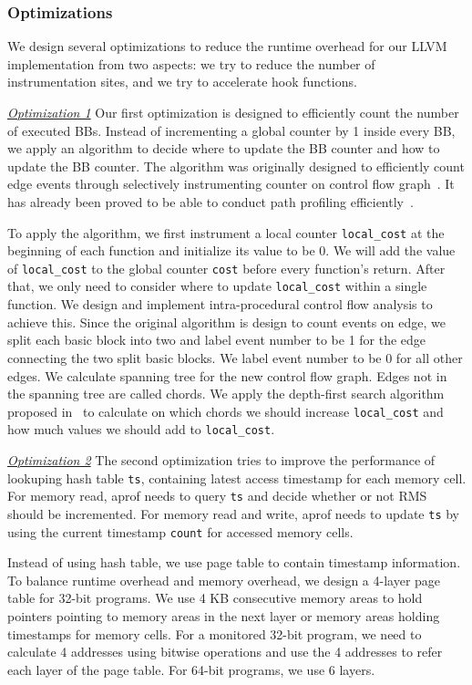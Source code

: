\subsubsection{Optimizations}
We design several optimizations to reduce the 
runtime overhead for our LLVM implementation from two aspects:
we try to reduce the number of instrumentation sites, 
and we try to accelerate hook functions. 

{\underline{\textit{Optimization 1}}
Our first optimization is designed to efficiently count the number of executed BBs.
Instead of incrementing a global counter by 1 inside every BB,
we apply an algorithm to decide where to update the BB counter and how to update the BB counter. 
The algorithm was originally designed to 
efficiently count edge events through selectively instrumenting counter 
on control flow graph~\cite{event-counting}. 
It has already been proved to be able to conduct path 
profiling efficiently~\cite{peter-ase,path-profiling}.

To apply the algorithm, we first instrument a local counter 
\texttt{local\_cost} at the beginning of each function
and initialize its value to be 0. 
We will add the value of \texttt{local\_cost} to the 
global counter \texttt{cost} before 
every function's return.
After that, we only need to consider where to update \texttt{local\_cost} 
within a single function.
We design and implement intra-procedural 
control flow analysis to achieve this.
Since the original algorithm is design to count events on edge,
we split each basic block into two and label event number to be 1 
for the edge connecting the two split basic blocks.  
We label event number to be 0 for all other edges. 
We calculate spanning tree for the new control flow graph. 
Edges not in the spanning tree are called chords.
We apply the depth-first search algorithm proposed in~\cite{event-counting} 
to calculate on which chords we should increase 
\texttt{local\_cost} and how much values 
we should add to \texttt{local\_cost}.


{\underline{\textit{Optimization 2}}
The second optimization tries to improve the performance of 
lookuping hash table \texttt{ts}, 
containing latest access timestamp for each memory cell.
For memory read, 
aprof needs to query \texttt{ts} and decide 
whether or not RMS should be incremented.
For memory read and write, 
aprof needs to update \texttt{ts} by using the current timestamp \texttt{count}
for accessed memory cells. 

Instead of using hash table, 
we use page table to contain timestamp information. 
To balance runtime overhead and memory overhead, 
we design a 4-layer page table for 32-bit programs.
We use 4 KB consecutive memory areas to hold pointers pointing to 
memory areas in the next layer 
or memory areas holding timestamps for memory cells. 
For a monitored 32-bit program, 
we need to calculate 4 addresses using bitwise operations 
and use the 4 addresses to refer each layer of the page table.  
For 64-bit programs, we use 6 layers.  


}}
